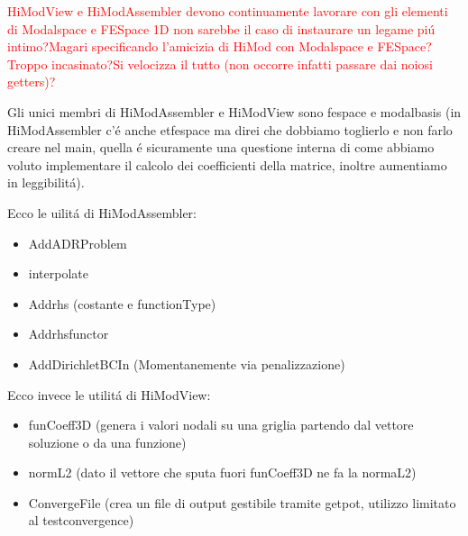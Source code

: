  \textcolor{red}{HiModView e HiModAssembler devono continuamente lavorare con gli elementi di Modalspace e FESpace 1D non sarebbe il caso di instaurare un legame pi\'u intimo?Magari specificando l'amicizia di HiMod con Modalspace e FESpace?Troppo incasinato?Si velocizza il tutto (non occorre infatti passare dai noiosi getters)?}
 
Gli unici membri di HiModAssembler e HiModView sono fespace e modalbasis (in HiModAssembler c'\'e anche etfespace ma direi che dobbiamo toglierlo e non farlo creare nel main, quella \'e sicuramente una questione interna di come abbiamo voluto implementare il calcolo dei coefficienti della matrice, inoltre aumentiamo in leggibilit\'a).

Ecco le uilit\'a di HiModAssembler:
\begin{itemize}
\item AddADRProblem
\item interpolate
\item Addrhs (costante e functionType)
\item Addrhsfunctor
\item AddDirichletBCIn (Momentanemente via penalizzazione)
\end{itemize}

Ecco invece le utilit\'a di HiModView:
\begin{itemize}
\item funCoeff3D (genera i valori nodali su una griglia partendo dal vettore soluzione o da una funzione)
\item normL2 (dato il vettore che sputa fuori funCoeff3D ne fa la normaL2)
\item ConvergeFile (crea un file di output gestibile tramite getpot, utilizzo limitato al testconvergence)
\end{itemize}